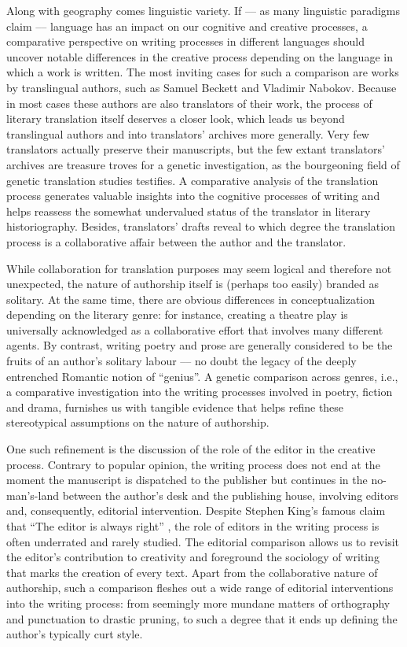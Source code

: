 \begin{preface}
Along with geography comes linguistic variety. If –– as many linguistic
paradigms claim –– language has an impact on our cognitive and creative
processes, a comparative perspective on writing processes in different
languages should uncover notable differences in the creative process
depending on the language in which a work is written. The most inviting
cases for such a comparison are works by translingual authors, such as
Samuel Beckett and Vladimir Nabokov. Because in most cases these authors
are also translators of their work, the process of literary translation
itself deserves a closer look, which leads us beyond translingual
authors and into translators' archives more generally. Very few
translators actually preserve their manuscripts, but the few extant
translators' archives are treasure troves for a genetic investigation,
as the bourgeoning field of genetic translation studies testifies. A
comparative analysis of the translation process generates valuable
insights into the cognitive processes of writing and helps reassess the
somewhat undervalued status of the translator in literary
historiography. Besides, translators' drafts reveal to which degree the
translation process is a collaborative affair between the author and the
translator.

While collaboration for translation purposes may seem logical and
therefore not unexpected, the nature of authorship itself is (perhaps
too easily) branded as solitary. At the same time, there are obvious
differences in conceptualization depending on the literary genre: for
instance, creating a theatre play is universally acknowledged as a
collaborative effort that involves many different agents. By contrast,
writing poetry and prose are generally considered to be the fruits of an
author's solitary labour –– no doubt the legacy of the deeply entrenched
Romantic notion of ``genius''. A genetic comparison across genres, i.e., a
comparative investigation into the writing processes involved in poetry,
fiction and drama, furnishes us with tangible evidence that helps refine
these stereotypical assumptions on the nature of authorship.

One such refinement is the discussion of the role of the editor in the
creative process. Contrary to popular opinion, the writing process does
not end at the moment the manuscript is dispatched to the publisher but
continues in \label{qtVanhulle2}the no-man's-land between the author's desk and the
publishing house, involving editors and, consequently, editorial
intervention. Despite Stephen King's famous claim that ``The editor is
always right'' \parencite[13]{king_writing_2000}, the role of editors in the writing
process is often underrated and rarely studied. The editorial comparison
allows us to revisit the editor's contribution to creativity and
foreground the sociology of writing that marks the creation of every
text. Apart from the collaborative nature of authorship, such a
comparison fleshes out a wide range of editorial interventions into the
writing process: from seemingly more mundane matters of orthography and
punctuation to drastic pruning, to such a degree that it ends up
defining the author's typically curt style.


\end{preface}
